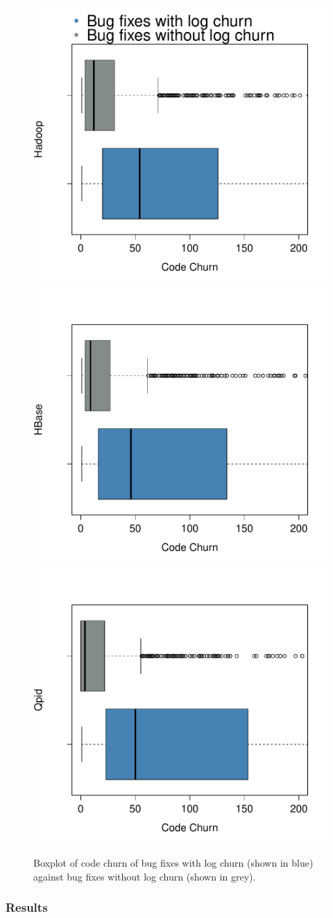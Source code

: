  \begin{figure}[t]
 	\centering
 	\caption{Boxplot of code churn of bug fixes with log churn (shown in blue) against bug fixes without log churn (shown in grey).}
 	\label{fig:figure3}
 	
 	\includegraphics[width=.49\textwidth]{HadoopBoxPlot}
 	\hfill
 	\includegraphics[width=.49\textwidth]{HBaseBoxPlot}\hfill
 	\includegraphics[width=.49\textwidth]{QpidBoxPlot}
 	
 \end{figure}


\subsubsection*{Results}

